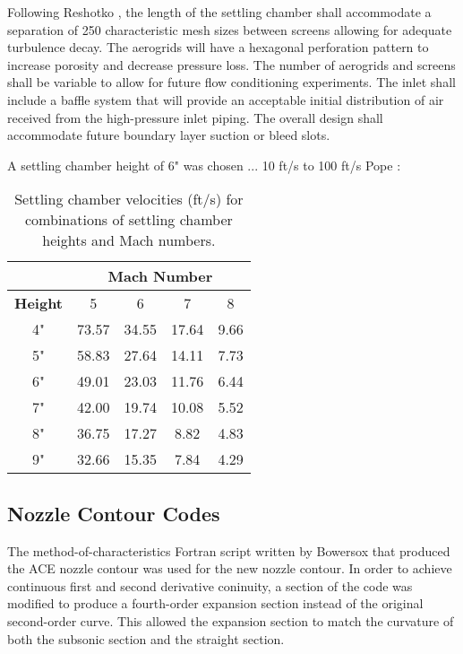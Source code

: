 Following Reshotko \cite{reshotko}, the length of the settling chamber shall accommodate a separation of 250 characteristic mesh sizes between screens allowing for adequate turbulence decay. The aerogrids will have a hexagonal perforation pattern to increase porosity and decrease pressure loss. The number of aerogrids and screens shall be variable to allow for future flow conditioning experiments. The inlet shall include a baffle system that will provide an acceptable initial distribution of air received from the high-pressure inlet piping. The overall design shall accommodate future boundary layer suction or bleed slots.

A settling chamber height of 6" was chosen ... 10 ft/s to 100 ft/s Pope \cite{pope}:

\begin{table}[ht]
    \centering
    \label{tab:sc_vel}
    \begin{tabular}{|c|c|c|c|c|}
        \cline{2-5}
        \multicolumn{1}{c}{} & \multicolumn{4}{|c|}{\textbf{Mach Number}} \\ \hline
        \textbf{Height} & 5 & 6 & 7 & 8 \\ \hline
        4" & 73.57 & 34.55 & 17.64 & 9.66 \\ \hline
        5" & 58.83 & 27.64 & 14.11 & 7.73 \\ \hline \hline
        6" & 49.01 & 23.03 & 11.76 & 6.44 \\ \hline \hline
        7" & 42.00 & 19.74 & 10.08 & 5.52 \\ \hline
        8" & 36.75 & 17.27 & 8.82 & 4.83 \\ \hline
        9" & 32.66 & 15.35 & 7.84 & 4.29 \\ \hline
    \end{tabular}
    \caption{Settling chamber velocities (ft/s) for combinations of settling chamber heights and Mach numbers.}
\end{table}
    
\subsection{Nozzle Contour Codes}

The method-of-characteristics Fortran script written by Bowersox that produced the ACE nozzle contour was used for the new nozzle contour. In order to achieve continuous first and second derivative coninuity, a section of the code was modified to produce a fourth-order expansion section instead of the original second-order curve. This allowed the expansion section to match the curvature of both the subsonic section and the straight section.

